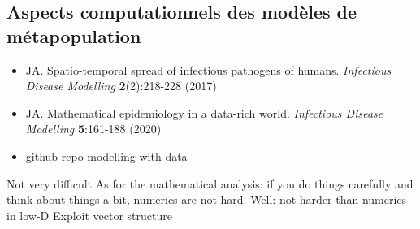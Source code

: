 \documentclass[aspectratio=169]{beamer}\usepackage[]{graphicx}\usepackage[]{xcolor}
\begin{document}




\subsection{Aspects computationnels des modèles de métapopulation}

\begin{frame}
	\begin{itemize}
		\item JA. \href{https://doi.org/10.1016/j.idm.2017.05.001}{Spatio-temporal spread of infectious pathogens of humans}. \emph{Infectious Disease Modelling} \textbf{2}(2):218-228 (2017)
		\item JA. \href{https://doi.org/10.1016/j.idm.2019.12.008}{Mathematical epidemiology in a data-rich world}. \emph{Infectious Disease Modelling} \textbf{5}:161-188 (2020)
		\item github repo \href{https://github.com/julien-arino/modelling-with-data}{modelling-with-data}
	\end{itemize}
\end{frame}

\begin{frame}{Not very difficult}
As for the mathematical analysis: if you do things carefully and think about things a bit, numerics are not hard. Well: not harder than numerics in low-D
\vfill
Exploit vector structure
\end{frame}
\end{document}
